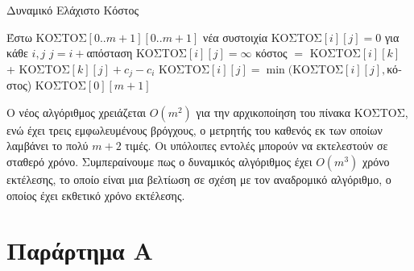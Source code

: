 \documentclass{article}
\begin{document}
\begin{algorithm}

\renewcommand{\algorithmicif}{\textbf{\foreignlanguage{greek}{Αν}}}
\renewcommand{\algorithmicfor}{\textbf{\foreignlanguage{greek}{Για}}}
\renewcommand{\algorithmicend}{\textbf{\foreignlanguage{greek}{Τέλος}}}
\renewcommand{\algorithmicdo}{}
\renewcommand{\algorithmicthen}{\textbf{\foreignlanguage{greek}{τότε}}}
\renewcommand{\algorithmicreturn}{\textbf{\foreignlanguage{greek}{Επίστρεψε}}}
\renewcommand{\algorithmicelse}{\textbf{\foreignlanguage{greek}{Αλλιώς}}}
\renewcommand{\algorithmicprocedure}{}

\caption{\foreignlanguage{greek}{Δυναμικό Ελάχιστο Κόστος}} \label{alg:min_cost_dynamic}
\begin{algorithmic}[1]
\State \foreignlanguage{greek}{Έστω ΚΟΣΤΟΣ}$[0..m+1][0..m+1]$ \foreignlanguage{greek}{νέα συστοιχία}
\State \foreignlanguage{greek}{ΚΟΣΤΟΣ}$[i][j] = 0$ \foreignlanguage{greek}{για κάθε} $i,j$
        \State $j = i + $\foreignlanguage{greek}{απόσταση}
        \State \foreignlanguage{greek}{ΚΟΣΤΟΣ}$[i][j] = \infty$
            \State \foreignlanguage{greek}{κόστος $=$ ΚΟΣΤΟΣ$[i][k]$ + ΚΟΣΤΟΣ$[k][j] + c_j - c_i$}
            \State \foreignlanguage{greek}{ΚΟΣΤΟΣ$[i][j] = \min($ΚΟΣΤΟΣ$[i][j],$κόστος)}
        \EndFor
    \EndFor
\EndFor
\State \Return \foreignlanguage{greek}{ΚΟΣΤΟΣ}$[0][m+1]$
\EndProcedure
\end{algorithmic}    
\end{algorithm}
Ο νέος αλγόριθμος χρειάζεται $Ο(m^2)$ για την αρχικοποίηση του πίνακα ΚΟΣΤΟΣ, ενώ έχει τρεις εμφωλευμένους βρόγχους, ο μετρητής του καθενός εκ των οποίων λαμβάνει το πολύ $m + 2$ τιμές. Οι υπόλοιπες εντολές μπορούν να εκτελεστούν σε σταθερό χρόνο. Συμπεραίνουμε πως ο δυναμικός αλγόριθμος έχει $O(m^3)$ χρόνο εκτέλεσης, το οποίο είναι μια βελτίωση σε σχέση με τον αναδρομικό αλγόριθμο, ο οποίος έχει εκθετικό χρόνο εκτέλεσης.

\section*{Παράρτημα A}
\end{document}
